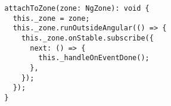 \begin{verbatim}
  attachToZone(zone: NgZone): void {
    this._zone = zone;
    this._zone.runOutsideAngular(() => {
      this._zone.onStable.subscribe({
        next: () => {
          this._handleOnEventDone();
        },
      });
    });
  }
\end{verbatim}
